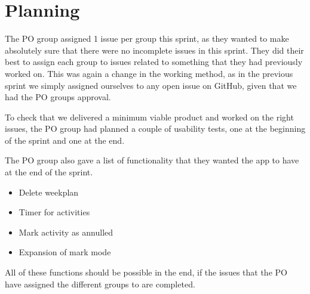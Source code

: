 \section{Planning}
The PO group assigned 1 issue per group this sprint, as they wanted to make absolutely sure that there were no incomplete issues in this sprint. 
They did their best to assign each group to issues related to something that they had previously worked on.
This was again a change in the working method, as in the previous sprint we simply assigned ourselves to any open issue on GitHub, given that we had the PO groups approval.

To check that we delivered a minimum viable product and worked on the right issues, the PO group had planned a couple of usability tests, one at the beginning of the sprint and one at the end.

The PO group also gave a list of functionality that they wanted the app to have at the end of the sprint.

\begin{itemize}
  \item Delete weekplan
  \item Timer for activities
  \item Mark activity as annulled
  \item Expansion of mark mode
\end{itemize}

All of these functions should be possible in the end, if the issues that the PO have assigned the different groups to are completed.
